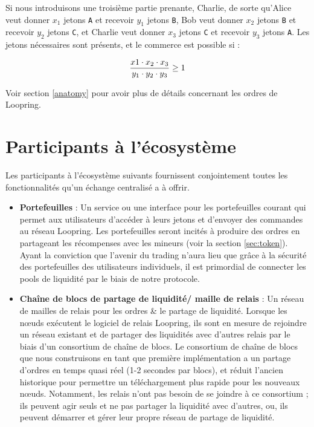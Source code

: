 \documentclass[UTF8,nofonts]{article}
\begin{document}
\begin{multicols}{2}
Si nous introduisons une troisième partie prenante, Charlie, de sorte qu'Alice veut donner $x_1$ jetons \verb|A| et recevoir $y_1$ jetons \verb|B|, Bob veut donner $x_2$ jetons \verb|B| et recevoir $y_2$ jetons \verb|C|, et Charlie veut donner $x_3$ jetons \verb|C| et recevoir $y_3$ jetons \verb|A|. Les jetons nécessaires sont présents, et le commerce est possible si :

\begin{equation}
{{x1 \cdot x_2 \cdot x_3 \over y_1 \cdot y_2 \cdot y_3} \geq 1}
\end{equation}


Voir section \ref{anatomy} pour avoir plus de détails concernant les ordres de Loopring.



\section{Participants à l'écosystème\label{sec:ecosystem}}
Les participants à l'écosystème suivants fournissent conjointement toutes les fonctionnalités qu'un échange centralisé a à offrir. 

\begin{itemize}

\item \textbf{Portefeuilles} : Un service ou une interface pour les portefeuilles courant qui permet aux utilisateurs d'accéder à leurs jetons et d'envoyer des commandes au réseau Loopring. Les portefeuilles seront incités à produire des ordres en partageant les récompenses avec les mineurs (voir la section \ref{sec:token}). Ayant la conviction que l'avenir du trading n’aura lieu que grâce à la sécurité des portefeuilles des utilisateurs individuels, il est primordial de connecter les pools de liquidité par le biais de notre protocole.

\item \textbf{Chaîne de blocs de partage de liquidité/ maille de relais } : Un réseau de mailles de relais pour les ordres \& le partage de liquidité. Lorsque les nœuds exécutent le logiciel de relais Loopring, ils sont en mesure de rejoindre un réseau existant et de partager des liquidités avec d'autres relais par le biais d'un consortium de chaîne de blocs. Le consortium de chaîne de blocs que nous construisons en tant que première implémentation a un partage d'ordres en temps quasi réel (1-2 secondes par blocs), et réduit l'ancien historique pour permettre un téléchargement plus rapide pour les  nouveaux nœuds. Notamment, les relais n'ont pas besoin de se joindre à ce consortium ; ils peuvent agir seuls et ne pas partager la liquidité avec d'autres, ou, ils peuvent démarrer et gérer leur propre réseau de partage de liquidité.


\end{itemize}
\end{multicols}
\end{document}
